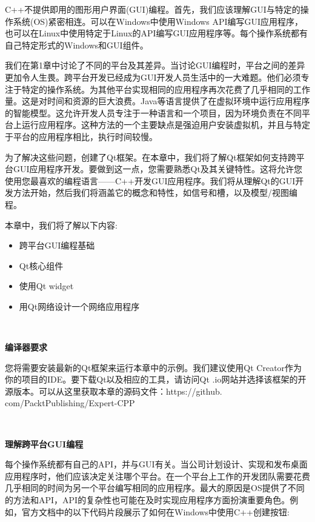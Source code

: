 C++不提供即用的图形用户界面(GUI)编程。首先，我们应该理解GUI与特定的操作系统(OS)紧密相连。可以在Windows中使用Windows API编写GUI应用程序，也可以在Linux中使用特定于Linux的API编写GUI应用程序等。每个操作系统都有自己特定形式的Windows和GUI组件。 \par
我们在第1章中讨论了不同的平台及其差异。当讨论GUI编程时，平台之间的差异更加令人生畏。跨平台开发已经成为GUI开发人员生活中的一大难题。他们必须专注于特定的操作系统。为其他平台实现相同的应用程序再次花费了几乎相同的工作量。这是对时间和资源的巨大浪费。Java等语言提供了在虚拟环境中运行应用程序的智能模型。这允许开发人员专注于一种语言和一个项目，因为环境负责在不同平台上运行应用程序。这种方法的一个主要缺点是强迫用户安装虚拟机，并且与特定于平台的应用程序相比，执行时间较慢。 \par
为了解决这些问题，创建了Qt框架。在本章中，我们将了解Qt框架如何支持跨平台GUI应用程序开发。要做到这一点，您需要熟悉Qt及其关键特性。这将允许您使用您最喜欢的编程语言——C++开发GUI应用程序。我们将从理解Qt的GUI开发方法开始，然后我们将涵盖它的概念和特性，如信号和槽，以及模型/视图编程。 \par

本章中，我们将了解以下内容: \par

\begin{itemize}
	\item 跨平台GUI编程基础
	\item Qt核心组件
	\item 使用Qt widget
	\item 用Qt网络设计一个网络应用程序
\end{itemize}

\noindent\textbf{}\ \par
\textbf{编译器要求} \ \par
您将需要安装最新的Qt框架来运行本章中的示例。我们建议使用Qt Creator作为你的项目的IDE。要下载Qt以及相应的工具，请访问Qt .io网站并选择该框架的开源版本。可以从这里获取本章的源码文件：https:/​/github.​com/PacktPublishing/Expert-CPP \par

\noindent\textbf{}\ \par
\textbf{理解跨平台GUI编程} \ \par
每个操作系统都有自己的API，并与GUI有关。当公司计划设计、实现和发布桌面应用程序时，他们应该决定关注哪个平台。在一个平台上工作的开发团队需要花费几乎相同的时间为另一个平台编写相同的应用程序。最大的原因是OS提供了不同的方法和API，API的复杂性也可能在及时实现应用程序方面扮演重要角色。例如，官方文档中的以下代码片段展示了如何在Windows中使用C++创建按钮: \par

